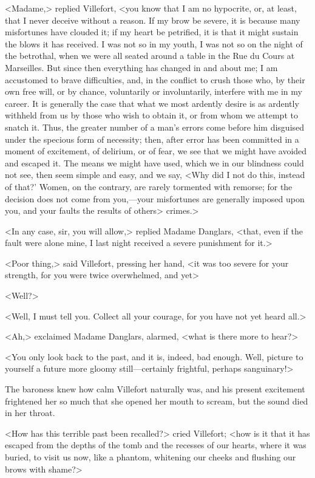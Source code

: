  <Madame,> replied Villefort, <you know that I am no hypocrite, or, at least, that I never deceive without a reason. If my brow be severe, it is because many misfortunes have clouded it; if my heart be petrified, it is that it might sustain the blows it has received. I was not so in my youth, I was not so on the night of the betrothal, when we were all seated around a table in the Rue du Cours at Marseilles. But since then everything has changed in and about me; I am accustomed to brave difficulties, and, in the conflict to crush those who, by their own free will, or by chance, voluntarily or involuntarily, interfere with me in my career. It is generally the case that what we most ardently desire is as ardently withheld from us by those who wish to obtain it, or from whom we attempt to snatch it. Thus, the greater number of a man's errors come before him disguised under the specious form of necessity; then, after error has been committed in a moment of excitement, of delirium, or of fear, we see that we might have avoided and escaped it. The means we might have used, which we in our blindness could not see, then seem simple and easy, and we say, <Why did I not do this, instead of that?' Women, on the contrary, are rarely tormented with remorse; for the decision does not come from you,—your misfortunes are generally imposed upon you, and your faults the results of others> crimes.> 

 <In any case, sir, you will allow,> replied Madame Danglars, <that, even if the fault were alone mine, I last night received a severe punishment for it.> 

 <Poor thing,> said Villefort, pressing her hand, <it was too severe for your strength, for you were twice overwhelmed, and yet\longdash> 

 <Well?> 

 <Well, I must tell you. Collect all your courage, for you have not yet heard all.> 

 <Ah,> exclaimed Madame Danglars, alarmed, <what is there more to hear?> 

 <You only look back to the past, and it is, indeed, bad enough. Well, picture to yourself a future more gloomy still—certainly frightful, perhaps sanguinary!> 

 The baroness knew how calm Villefort naturally was, and his present excitement frightened her so much that she opened her mouth to scream, but the sound died in her throat. 

 <How has this terrible past been recalled?> cried Villefort; <how is it that it has escaped from the depths of the tomb and the recesses of our hearts, where it was buried, to visit us now, like a phantom, whitening our cheeks and flushing our brows with shame?> 

